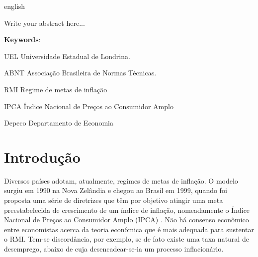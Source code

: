 \documentclass[12pt,oneside,a4paper,chapter=TITLE,english,brazil,sumario=abnt-6027-2012]{abntex2}
\begin{document}
\begin{resumo}[Abstract]
	\begin{otherlanguage*}{english}
		
		Write your abstract here... 
		
		\vspace{\onelineskip}
		
		\noindent 
		\textbf{Keywords}: 
	\end{otherlanguage*}
\end{resumo}
\pagebreak


\listoffigures*
\cleardoublepage


\listoftables*
\cleardoublepage


\begin{siglas}
	\item[UEL] Universidade Estadual de Londrina. 
	\item[ABNT] Associação Brasileira de Normas Técnicas.
	\item[RMI] Regime de metas de inflação
	\item[IPCA] Índice Nacional de Preços ao Consumidor Amplo
\end{siglas}
\pagebreak


\begin{simbolos}
	\item[Depeco] Departamento de Economia
\end{simbolos}
\pagebreak


\tableofcontents*
\cleardoublepage


\textual %
\pagestyle{simple}

\chapter{Introdução}

Diversos países adotam, atualmente, regimes de metas de inflação. O modelo surgiu em 1990 na Nova Zelândia e chegou ao Brasil em 1999, quando foi proposta uma série de diretrizes que têm por objetivo atingir uma meta preestabelecida de crescimento de um índice de inflação, nomeadamente o Índice Nacional de Preços ao Consumidor Amplo (IPCA) \cite{sicsu2002teoriarmi}. Não há consenso econômico entre economistas acerca da teoria econômica que é mais adequada para sustentar o RMI. Tem-se discordância, por exemplo, se de fato existe uma taxa natural de desemprego, abaixo de cuja desencadear-se-ia um processo inflacionário.
\end{document}

